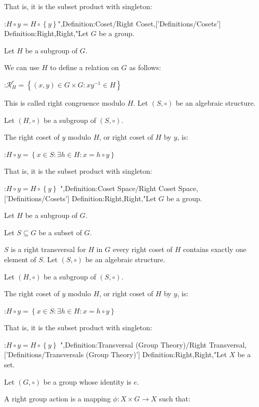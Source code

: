 That is, it is the subset product with singleton:

:$H \circ y = H \circ \left\lbrace y \right\rbrace$",Definition:Coset/Right Coset,['Definitions/Cosets']
Definition:Right,Right,"Let $G$ be a group.

Let $H$ be a subgroup of $G$.


We can use $H$ to define a relation on $G$ as follows:

:$\mathcal R^r_H = \left\lbrace \left( x, y \right) \in G \times G: x y^{-1} \in H \right\rbrace$

This is called right congruence modulo $H$.
Let $\left( S, \circ \right)$ be an algebraic structure.

Let $\left( H, \circ \right)$ be a subgroup of $\left( S, \circ \right)$.


The right coset of $y$ modulo $H$, or right coset of $H$ by $y$, is:

:$H \circ y = \left\lbrace x \in S: \exists h \in H: x = h \circ y \right\rbrace$


That is, it is the subset product with singleton:

:$H \circ y = H \circ \left\lbrace y \right\rbrace$
",Definition:Coset Space/Right Coset Space,['Definitions/Cosets']
Definition:Right,Right,"Let $G$ be a group.

Let $H$ be a subgroup of $G$.

Let $S \subseteq G$ be a subset of $G$.


$S$ is a right transversal for $H$ in $G$  every right coset of $H$ contains exactly one element of $S$.
Let $\left( S, \circ \right)$ be an algebraic structure.

Let $\left( H, \circ \right)$ be a subgroup of $\left( S, \circ \right)$.


The right coset of $y$ modulo $H$, or right coset of $H$ by $y$, is:

:$H \circ y = \left\lbrace x \in S: \exists h \in H: x = h \circ y \right\rbrace$


That is, it is the subset product with singleton:

:$H \circ y = H \circ \left\lbrace y \right\rbrace$
",Definition:Transversal (Group Theory)/Right Transversal,['Definitions/Transversals (Group Theory)']
Definition:Right,Right,"Let $X$ be a set.

Let $\left( G, \circ \right)$ be a group whose identity is $e$.


A right group action is a mapping $\phi: X \times G \to X$ such that:


